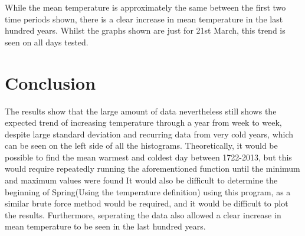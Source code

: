 \documentclass[a4paper,10pt,oneside]{article}
\begin{document}
While the mean temperature is approximately the same between the first two time periods
shown, there is a clear increase in mean temperature in the last hundred years. Whilst the graphs
shown are just for 21st March, this trend is seen on all days tested.


\section{Conclusion}
\label{sec:conc}

The results show that the large amount of data nevertheless still shows the expected trend of increasing temperature through a year from week
to week, despite large standard deviation and recurring data from very cold years, which can be seen on
the left side of all the histograms. Theoretically, it would be possible to find the mean warmest and coldest day between 1722-2013,
but this would require repeatedly running the aforementioned function until the minimum and maximum values were found
It would also be difficult to determine the beginning of Spring(Using the temperature definition) using this program,
as a similar brute force method would be required, and it would be difficult to plot the results. Furthermore, seperating
the data also allowed a clear increase in mean temperature to be seen in the last hundred years.






 
\end{document}
